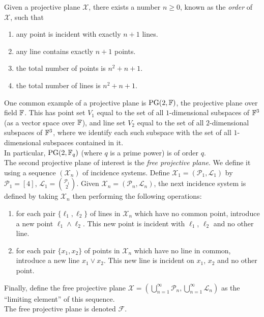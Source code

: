 	\begin{flem}
		Given a projective plane $\mathcal{X}$, there exists a number $n \ge 0$, known as the \emph{order} of $\mathcal{X}$, such that
		\begin{enumerate}
			\item any point is incident with exactly $n+1$ lines.
			\item any line contains exactly $n+1$ points.
			\item the total number of points is $n^2+n+1$.
			\item the total number of lines is $n^2+n+1$.
		\end{enumerate}
	\end{flem}

	One common example of a projective plane is $\operatorname{PG}(2,\mathbb{F})$, the projective plane over field $\mathbb{F}$. This has point set $V_1$ equal to the set of all $1$-dimensional subspaces of $\mathbb{F}^3$ (as a vector space over $\mathbb{F}$), and line set $V_2$ equal to the set of all $2$-dimensional subspaces of $\mathbb{F}^3$, where we identify each such subspace with the set of all $1$-dimensional subspaces contained in it.\\
	In particular, $\operatorname{PG}(2,\mathbb{F}_q)$ (where $q$ is a prime power) is of order $q$.\\

	The second projective plane of interest is the \emph{free projective plane}. We define it using a sequence $(\mathcal{X}_n)$ of incidence systems. Define $\mathcal{X_1} = (\mathcal{P}_1,\mathcal{L}_1)$ by $\mathcal{P}_1 = [4]$, $\mathcal{L}_1 = \binom{\mathcal{P}_1}{2}$. Given $\mathcal{X}_n = (\mathcal{P}_n,\mathcal{L}_n)$, the next incidence system is defined by taking $\mathcal{X}_n$ then performing the following operations:
	\begin{enumerate}
		\item for each pair $\{\ell_1,\ell_2\}$ of lines in $\mathcal{X}_n$ which have no common point, introduce a new point $\ell_1 \land \ell_2$. This new point is incident with $\ell_1$, $\ell_2$ and no other line.
		\item for each pair $\{x_1,x_2\}$ of points in $\mathcal{X}_n$ which have no line in common, introduce a new line $x_1 \lor x_2$. This new line is incident on $x_1$, $x_2$ and no other point.
	\end{enumerate}
	Finally, define the free projective plane $\mathcal{X} = (\bigcup_{n=1}^\infty \mathcal{P}_n,\bigcup_{n=1}^\infty \mathcal{L}_n)$ as the ``limiting element'' of this sequence.\\
	The free projective plane is denoted $\mathcal{F}$.

